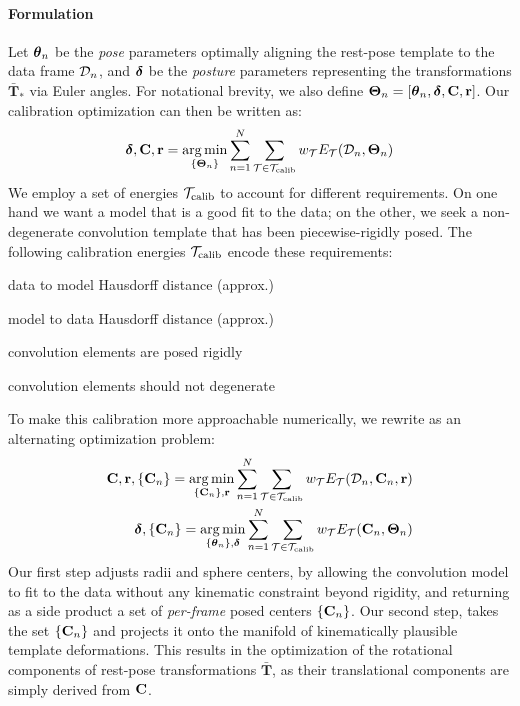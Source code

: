 \paragraph{Formulation}
Let $\boldsymbol{\theta}_n$ be the \emph{pose} parameters optimally aligning the rest-pose template to the data frame $\mathcal{D}_n$, and $\boldsymbol{\delta}$ be the \emph{posture} parameters representing the transformations $\mathbf{\bar{T}}_*$ via Euler angles. For notational brevity, we also define $\boldsymbol{\Theta}_n=[\boldsymbol{\theta}_n, \boldsymbol{\delta}, {\mathbf{C}}, {\mathbf{r}}]$. Our calibration optimization can then be written as:
% 
\begin{eqnarray}
\boldsymbol{\delta}, {\mathbf{C}}, {\mathbf{r}} = \operatorname*{arg\,min}_{\{\boldsymbol{\Theta}_n\}}
\sum_{n=1}^N 
\sum_{\mathcal{T} \in {\mathcal{T}_\text{calib}}} 
w_\mathcal{T} E_\mathcal{T}(\mathcal{D}_n, \boldsymbol{\Theta}_n)
\label{eq:calibration}
\end{eqnarray}
% 
We employ a set of energies ${\mathcal{T}_\text{calib}}$ to account for different requirements. On one hand we want a model that is a good fit to the data; on the other, we seek a non-degenerate convolution template that has been piecewise-rigidly posed. The following calibration energies ${\mathcal{T}_\text{calib}}$ encode these requirements:
% 
\begin{description}[labelsep=0em,labelwidth=.4in,labelindent=1cm,itemsep=-.6em]
\item[d2m] data to model Hausdorff distance (approx.)
\item[m2d] model to data Hausdorff distance (approx.)
\item[rigid] convolution elements are posed rigidly
\item[valid] convolution elements should not degenerate
\end{description}
% 
To make this calibration more approachable numerically, we rewrite  as an alternating optimization problem:
% 
\begin{eqnarray}
{\mathbf{C}}, {\mathbf{r}}, {\{\mathbf{C}_n\}} =
\operatorname*{arg\,min}_{{\{\mathbf{C}_n\}}, {\mathbf{r}}} 
\sum_{n=1}^N 
\sum_{\mathcal{T} \in {\mathcal{T}_\text{calib}}}
w_\mathcal{T} E_\mathcal{T}(\mathcal{D}_n, {\mathbf{C}}_n, {\mathbf{r}})
\label{eq:step1}
\\
\boldsymbol{\delta}, {\{\mathbf{C}_n\}} =
\operatorname*{arg\,min}_{{\{\boldsymbol{\theta}_n\}},\boldsymbol{\delta}} 
\sum_{n=1}^N 
\sum_{\mathcal{T} \in {\mathcal{T}_\text{calib}}}
w_\mathcal{T} E_\mathcal{T}({\mathbf{C}}_n, \boldsymbol{\Theta}_n) 
\end{eqnarray}
% 
Our first step adjusts radii and sphere centers, by allowing the convolution model to fit to the data without any kinematic constraint beyond rigidity, and returning as a side product a set of \emph{per-frame} posed centers ${\{\mathbf{C}_n\}}$. Our second step, takes the set ${\{\mathbf{C}_n\}}$ and projects it onto the manifold of kinematically plausible template deformations. This results in the optimization of the rotational components of rest-pose transformations $\mathbf{\bar{T}}$, as their translational components are simply derived from ${\mathbf{C}}$.

